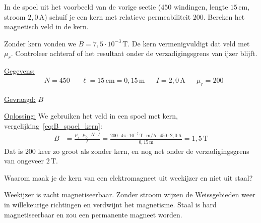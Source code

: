 \documentclass{ximera}
\begin{document}
\begin{example}[foldable=true,title={Spoel met een kern van weekijzer}]\nl
    In de spoel uit het voorbeeld van de vorige sectie ($450$ windingen, lengte $15\,\mathrm{cm}$, stroom $2{,}0\,\mathrm{A}$) schuif je een kern met relatieve permeabiliteit $200$. Bereken het magnetisch veld in de kern.

    \begin{remark}[title={Denkstap}]\nl
        Zonder kern vonden we $B = 7{,}5 \cdot 10^{-3}\,\mathrm{T}$. De kern vermenigvuldigt dat veld met $\mu_r$. Controleer achteraf of het resultaat onder de verzadigingsgrens van ijzer blijft.
    \end{remark}

    \begin{solution}\nl
        \underline{Gegevens:}
        \begin{align*}
            & N = 450 & & \ell = 15\,\mathrm{cm} = 0{,}15\,\mathrm{m} & & I = 2{,}0\,\mathrm{A} & & \mu_r = 200
        \end{align*}

        \underline{Gevraagd:} $B$

        \underline{Oplossing:} We gebruiken het veld in een spoel met kern, vergelijking~\eqref{eq:B_spoel_kern}:
        \begin{align*}
            B &= \frac{\mu_r \cdot \mu_0 \cdot N \cdot I}{\ell} = \frac{200 \cdot 4\pi \cdot 10^{-7}\,\mathrm{T\cdot m/A} \cdot 450 \cdot 2{,}0\,\mathrm{A}}{0{,}15\,\mathrm{m}} = \boxed{1{,}5\,\mathrm{T}}
        \end{align*}
        Dat is $200$ keer zo groot als zonder kern, en nog net onder de verzadigingsgrens van ongeveer $2\,\mathrm{T}$.
    \end{solution}
\end{example}

\begin{question}
    Waarom maak je de kern van een elektromagneet uit weekijzer en niet uit staal?

    \begin{multipleChoice}
    \end{multipleChoice}

    \begin{solution}\nl
        Weekijzer is zacht magnetiseerbaar. Zonder stroom wijzen de Weissgebieden weer in willekeurige richtingen en verdwijnt het magnetisme. Staal is hard magnetiseerbaar en zou een permanente magneet worden.
    \end{solution}
\end{question}
\end{document}
